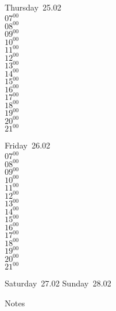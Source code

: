 \documentclass[11pt,a4paper]{book}\usepackage[]{graphicx}\usepackage[]{color}
\begin{document}
\clearpage
\begin{headerbox}
\end{headerbox}
\begin{weekdaybox}
  Thursday~25.02\\
  { 
  \vfill
  $07^{00}$\\
$08^{00}$\\
$09^{00}$\\
$10^{00}$\\
$11^{00}$\\
$12^{00}$\\
$13^{00}$\\
$14^{00}$\\
$15^{00}$\\
$16^{00}$\\
$17^{00}$\\
$18^{00}$\\
$19^{00}$\\
$20^{00}$\\
$21^{00}$\\
  }
\end{weekdaybox} 
\begin{weekdaybox}
  Friday~26.02\\
  { 
  \vfill
  $07^{00}$\\
$08^{00}$\\
$09^{00}$\\
$10^{00}$\\
$11^{00}$\\
$12^{00}$\\
$13^{00}$\\
$14^{00}$\\
$15^{00}$\\
$16^{00}$\\
$17^{00}$\\
$18^{00}$\\
$19^{00}$\\
$20^{00}$\\
$21^{00}$\\
  }
\end{weekdaybox}
\begin{weekendbox}
  Saturday~27.02
  \tcblower
  Sunday~28.02
\end{weekendbox} %
\begin{notebox}
  Notes
\end{notebox}
\clearpage
\end{document}
